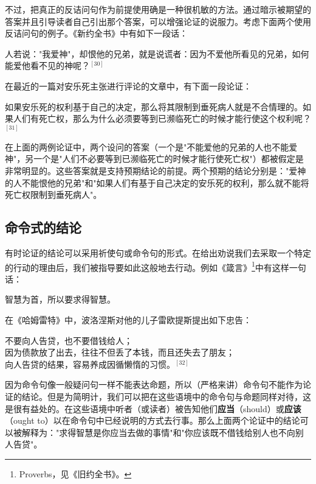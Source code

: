 不过，把真正的反诘问句作为前提使用确是一种很机敏的方法。通过暗示被期望的答案并且引导读者自己引出那个答案，可以增强论证的说服力。考虑下面两个使用反诘问句的例子。《新约全书》中有如下一段话：

\begin{displayquote}
人若说："我爱神"，却恨他的兄弟，就是说谎者：因为不爱他所看见的兄弟，如何能爱他看不见的神呢？${}^{[30]}$
\end{displayquote}

在最近的一篇对安乐死主张进行评论的文章中，有下面一段论证：

\begin{displayquote}
如果安乐死的权利基于自己的决定，那么将其限制到垂死病人就是不合情理的。如果人们有死亡权，那么为什么必须要等到已濒临死亡的时候才能行使这个权利呢？${}^{[31]}$
\end{displayquote}

在上面的两例论证中，两个设问的答案（一个是"不能爱他的兄弟的人也不能爱神"，另一个是"人们不必要等到已濒临死亡的时候才能行使死亡权"）都被假定是非常明显的。这些答案就是支持预期结论的前提。两个预期的结论分别是："爱神的人不能恨他的兄弟"和"如果人们有基于自己决定的安乐死的权利，那么就不能将死亡权限制到垂死病人"。

\subsection{命令式的结论}

有时论证的结论可以采用祈使句或命令句的形式。在给出劝说我们去采取一个特定的行动的理由后，我们被指导要如此这般地去行动。例如《箴言》\footnote{Proverbs，见《旧约全书》。}中有这样一句话：

\begin{displayquote}
智慧为首，所以要求得智慧。
\end{displayquote}

在《哈姆雷特》中，波洛涅斯对他的儿子雷欧提斯提出如下忠告：

\begin{displayquote}
不要向人告贷，也不要借钱给人；\\
因为债款放了出去，往往不但丢了本钱，而且还失去了朋友；\\
向人告贷的结果，容易养成因循懒惰的习惯。${}^{[32]}$
\end{displayquote}

因为命令句像一般疑问句一样不能表达命题，所以（严格来讲）命令句不能作为论证的结论。但是为简明计，我们可以把在这些语境中的命令句与命题同样对待，这是很有益处的。在这些语境中听者（或读者）被告知他们\textbf{应当}（should）或\textbf{应该}（ought to）以在命令句中已经说明的方式去行事。那么上面两个论证中的结论可以被解释为："求得智慧是你应当去做的事情"和"你应该既不借钱给别人也不向别人告贷"。

